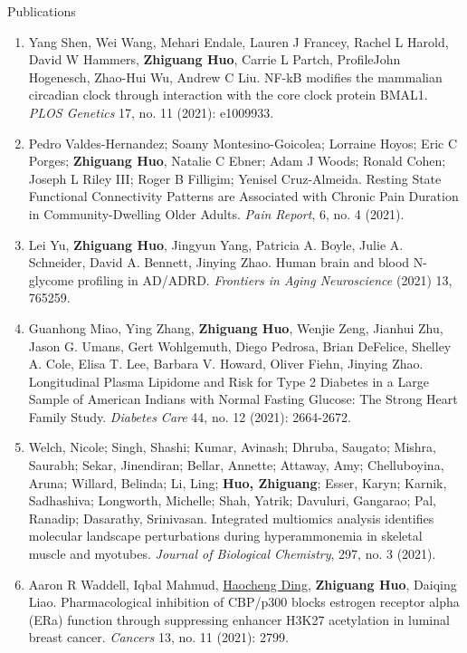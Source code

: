 \documentclass{resume} %
\begin{document}
\begin{rSection}{Publications}
\begin{enumerate}[noitemsep,topsep=0pt, resume]
\item  
Yang Shen, Wei Wang, Mehari Endale, Lauren J Francey, Rachel L Harold, David W Hammers, {\bf Zhiguang Huo}, Carrie L Partch, ProfileJohn Hogenesch, Zhao-Hui Wu, Andrew C Liu.
NF-kB modifies the mammalian circadian clock through interaction with the core clock protein BMAL1.
\emph{PLOS Genetics} 17, no. 11 (2021): e1009933.


\item 
 Pedro Valdes-Hernandez; Soamy Montesino-Goicolea; Lorraine Hoyos; Eric C Porges; {\bf Zhiguang Huo}, Natalie C Ebner; Adam J Woods; Ronald Cohen; Joseph L Riley III; Roger B Filligim; Yenisel Cruz-Almeida. 
 Resting State Functional Connectivity Patterns are Associated with Chronic Pain Duration in Community-Dwelling Older Adults. 
\emph{Pain Report},  6, no. 4 (2021).


\item
Lei Yu, {\bf Zhiguang Huo}, Jingyun Yang, Patricia A. Boyle, Julie A. Schneider, David A. Bennett, Jinying Zhao.
Human brain and blood N-glycome profiling in AD/ADRD.
\emph{Frontiers in Aging Neuroscience} (2021) 13, 765259. 

\item
Guanhong Miao, Ying Zhang, {\bf Zhiguang Huo}, Wenjie Zeng, Jianhui Zhu, Jason G. Umans, Gert Wohlgemuth, Diego Pedrosa, Brian DeFelice, Shelley A. Cole, Elisa T. Lee, Barbara V. Howard, Oliver Fiehn, Jinying Zhao.
Longitudinal Plasma Lipidome and Risk for Type 2 Diabetes in a Large Sample of American Indians with Normal Fasting Glucose: The Strong Heart Family Study. 
\emph{Diabetes Care}  44, no. 12 (2021): 2664-2672.


\item
Welch, Nicole; Singh, Shashi; Kumar, Avinash; Dhruba, Saugato; Mishra, Saurabh; Sekar, Jinendiran; Bellar, Annette; Attaway, Amy; Chelluboyina, Aruna; Willard, Belinda; Li, Ling; {\bf Huo, Zhiguang}; Esser, Karyn; Karnik, Sadhashiva; Longworth, Michelle; Shah, Yatrik; Davuluri, Gangarao; Pal, Ranadip; Dasarathy, Srinivasan.
Integrated multiomics analysis identifies molecular landscape perturbations during hyperammonemia in skeletal muscle and myotubes. 
\emph{Journal of Biological Chemistry}, 297, no. 3 (2021).


\item
Aaron R Waddell, Iqbal Mahmud, \underline{Haocheng Ding}, {\bf Zhiguang Huo}, Daiqing Liao. 
Pharmacological inhibition of CBP/p300 blocks estrogen receptor alpha (ERa) function through suppressing enhancer H3K27 acetylation in luminal breast cancer.
\emph{Cancers} 13, no. 11 (2021): 2799.


\end{enumerate}
\end{rSection}
\end{document}
